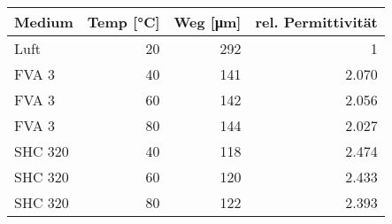 \begin{tabular}{lrrr}
    Medium  & Temp [\si{\degreeCelsius}] & Weg [\si{\um}] & rel. Permittivität \\
    \hline
    Luft    & 20                         & 292            & 1                  \\
    FVA 3   & 40                         & 141            & 2.070              \\
    FVA 3   & 60                         & 142            & 2.056              \\
    FVA 3   & 80                         & 144            & 2.027              \\
    SHC 320 & 40                         & 118            & 2.474              \\
    SHC 320 & 60                         & 120            & 2.433              \\
    SHC 320 & 80                         & 122            & 2.393              \\
\end{tabular}
